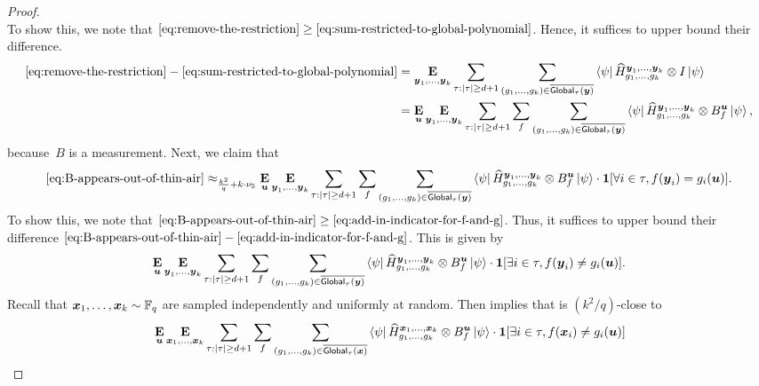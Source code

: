 \begin{proof}
\begin{equation}
\end{equation}
To show this, we note that $\eqref{eq:remove-the-restriction} \geq \eqref{eq:sum-restricted-to-global-polynomial}$. Hence, it suffices to upper bound their difference.
\begin{align}
\eqref{eq:remove-the-restriction} - \eqref{eq:sum-restricted-to-global-polynomial}
&= \mathop{\bf E\/}_{\boldsymbol{y}_1, \ldots, \boldsymbol{y}_k} \sum_{\tau:|\tau| \geq d+1} \sum_{(g_1, \ldots, g_k) \in \overline{\mathsf{Global}_{\tau}(\boldsymbol{y})}} \bra{\psi} \widehat{H}^{\boldsymbol{y}_1, \ldots, \boldsymbol{y}_k}_{g_1, \ldots, g_k} \otimes I \ket{\psi}\nonumber\\
&=  \mathop{\bf E\/}_{\boldsymbol{u}} \mathop{\bf E\/}_{\boldsymbol{y}_1, \ldots, \boldsymbol{y}_k}  \sum_{\tau:|\tau| \geq d+1} \sum_f \sum_{(g_1, \ldots, g_k) \in \overline{\mathsf{Global}_{\tau}(\boldsymbol{y})}} \bra{\psi} \widehat{H}^{\boldsymbol{y}_1, \ldots, \boldsymbol{y}_k}_{g_1, \ldots, g_k} \otimes B^{\boldsymbol{u}}_f \ket{\psi},\label{eq:B-appears-out-of-thin-air}
\end{align}
because~$B$ is a measurement. Next, we claim that
\begin{equation}\label{eq:add-in-indicator-for-f-and-g}
\eqref{eq:B-appears-out-of-thin-air}
\approx_{\frac{k^2}{q} + k \cdot\nu_5} 
\mathop{\bf E\/}_{\boldsymbol{u}} \mathop{\bf E\/}_{\boldsymbol{y}_1, \ldots, \boldsymbol{y}_k}   \sum_{\tau:|\tau| \geq d+1} \sum_f \sum_{(g_1, \ldots, g_k) \in \overline{\mathsf{Global}_{\tau}(\boldsymbol{y})}} \bra{\psi} \widehat{H}^{\boldsymbol{y}_1, \ldots, \boldsymbol{y}_k}_{g_1, \ldots, g_k} \otimes B^{\boldsymbol{u}}_f \ket{\psi} \cdot \boldsymbol{1}[\forall i\in \tau, f(\boldsymbol{y}_i) = g_i(\boldsymbol{u})].
\end{equation}
To show this, we note that $\eqref{eq:B-appears-out-of-thin-air} \geq \eqref{eq:add-in-indicator-for-f-and-g}$.
Thus, it suffices to upper bound their difference $\eqref{eq:B-appears-out-of-thin-air} - \eqref{eq:add-in-indicator-for-f-and-g}$. This is given by
\begin{equation}\label{eq:about-to-swap-x-for-y}
\mathop{\bf E\/}_{\boldsymbol{u}} \mathop{\bf E\/}_{\boldsymbol{y}_1, \ldots, \boldsymbol{y}_k}  \sum_{\tau: |\tau|\geq d+1} \sum_f  \sum_{(g_1, \ldots, g_k) \in \overline{\mathsf{Global}_{\tau}(\boldsymbol{y})}} \bra{\psi} \widehat{H}^{\boldsymbol{y}_1, \ldots, \boldsymbol{y}_k}_{g_1, \ldots, g_k} \otimes B^{\boldsymbol{u}}_f \ket{\psi} \cdot \boldsymbol{1}[\exists i \in \tau, f(\boldsymbol{y}_i) \neq g_i(\boldsymbol{u})].
\end{equation}
Recall that ${\boldsymbol{x}}_1, \ldots, {\boldsymbol{x}}_k \sim \mathbb F_q$ are sampled independently and uniformly at random.
Then  implies that  is $(k^2/q)$-close to
\begin{align*}
 &\E_{\bu} \E_{\bx_1, \ldots, \bx_k}  \sum_{\tau: |\tau|\geq d+1} \sum_f  \sum_{(g_1, \ldots, g_k) \in \overline{\mathsf{Global}_{\tau}(\bx)}} \bra{\psi} \widehat{H}^{\bx_1, \ldots, \bx_k}_{g_1, \ldots, g_k} \otimes B^{\bu}_f \ket{\psi} \cdot \bone[\exists i \in \tau, f(\bx_i) \neq g_i(\bu)]\\

\end{align*}
\end{proof}
